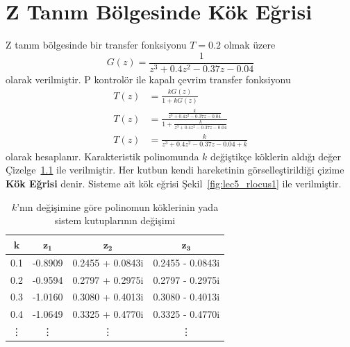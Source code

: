 \chapter{Z Tanım Bölgesinde Kök Eğrisi}
Z tanım bölgesinde bir transfer fonksiyonu $T=0.2$ olmak üzere
\begin{equation}
    G(z)=\frac{1}{z^3 + 0.4 z^2 - 0.37 z - 0.04}
\end{equation}
olarak verilmiştir. P kontrolör ile kapalı çevrim transfer fonksiyonu
\begin{equation}
\begin{split}
    T(z)&=\frac{kG(z)}{1+kG(z)}\\
    T(z)&=\frac{\frac{k}{z^3 + 0.4 z^2 - 0.37 z - 0.04}}{1+\frac{k}{z^3 + 0.4 z^2 - 0.37 z - 0.04}}\\
    T(z)&=\frac{k}{z^3 + 0.4 z^2 - 0.37 z - 0.04+k}
\end{split}
\end{equation}
olarak hesaplanır. Karakteristik polinomunda $k$ değiştikçe köklerin aldığı değer Çizelge~\ref{tbl:lec5_rlocus1} ile verilmiştir. Her kutbun kendi hareketinin görselleştirildiği çizime \textbf{Kök Eğrisi} denir. Sisteme ait kök eğrisi Şekil~\ref{fig:lec5_rlocus1} ile verilmiştir.

\setlength{\tabcolsep}{30pt}
\renewcommand{\arraystretch}{1}
\begin{table}[!htb]
    \caption{$k$'nın değişimine göre polinomun köklerinin yada sistem kutuplarının değişimi}\label{tbl:lec5_rlocus1}
    \begin{tabularx}{\textwidth}{cccc}\hline
    $\mathbf{k}$& $\mathbf{z_1}$& $\mathbf{z_2}$& $\mathbf{z_3}$\\\hline
    0.1& -0.8909& 0.2455 + 0.0843i&  0.2455 - 0.0843i\\
    0.2& -0.9594& 0.2797 + 0.2975i&  0.2797 - 0.2975i\\
    0.3& -1.0160& 0.3080 + 0.4013i&  0.3080 - 0.4013i\\
    0.4& -1.0649& 0.3325 + 0.4770i&  0.3325 - 0.4770i\\
    \vdots& \vdots& \vdots& \vdots\\\hline
    \end{tabularx}
\end{table}


